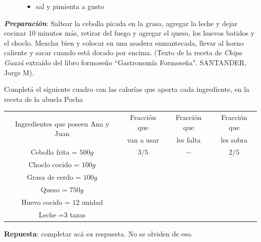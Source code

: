 \documentclass[11pt]{examdesign}
\theoremstyle{plain}
\theoremstyle{definition}
\theoremstyle{remark}
\begin{document}
\begin{shortanswer}[title={\textit{Receta que le dijo la Abuela Pocha a Ana y
    			Juan.}},
    	rearrange=no,resetcounter=no]
\begin{figure}[!h]
\begin{minipage}[b]{0.65\textwidth}
\begin{itemize}
    				\item sal y pimienta a gusto
    			\end{itemize}
    		\end{minipage}
    	\end{figure}
        \vspace{0.2cm}
        \textbf{\textit{\textcolor{upforestgreen}{Preparación}}}:
        \vspace{0.2cm}
        Saltear la cebolla picada en la grasa, agregar la leche y dejar cocinar $10$ minutos más, retirar del fuego y agregar el queso, los huevos batidos y el choclo. Mezclar bien y colocar en una asadera enmantecada, llevar al horno caliente y sacar cuando está dorado por encima. (\textcolor{dukeblue}{Texto de la receta de \textit{Chipa Guazú} extraído del libro formoseño “Gastronomía Formoseña". SANTANDER, Jorge M}).
    	\begin{question}
    		Completá el siguiente cuadro con las calorías que aporta cada ingrediente, en la receta de la abuela Pocha
    		\begin{center}
    			\begin{tabular}{|c|c|c|c|}
    				\hline 
    				\multirow{2}{*}{Ingredientes que poseen Ana y Juan} &Fracción que&
    				Fracción que&Fracción que
    				\\
    				&van a usar&les falta & les sobra\\\hline  
    				Cebolla frita = $500g$                  & $3/5$ & $-$ & $2/5$   
    				\\\hline
    				Choclo cocido = $100g$                  &       &     &   
    				\\\hline
    				Grasa de cerdo = $100g$                 &       &     &    
    				\\\hline
    				Queso = $750g$                          &       &     &    
    				\\\hline
    				Huevo cocido = $12$ unidad              &       &     &    
    				\\\hline
    				Leche =$3$ tazas                        &       &     &    
    				\\\hline
    			\end{tabular}
    		\end{center}
    		\begin{answer}
    			\textbf{Repuesta}: completar acá su respuesta. No se olviden de eso.
    		\end{answer}
    	\end{question}
        
    \end{shortanswer}
\end{document}

